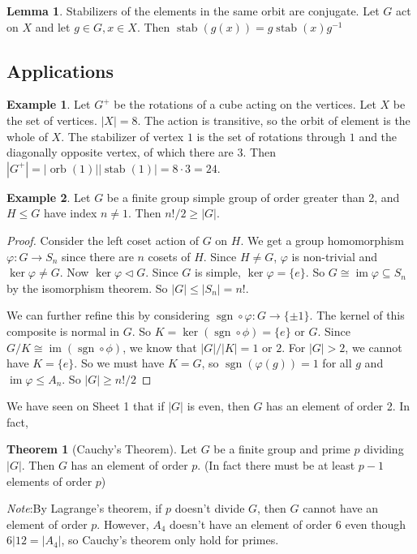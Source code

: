 \documentclass[a4paper]{article}
\theoremstyle{definition}
\newtheorem*{thm}{Theorem}
\newtheorem*{eg}{Example}
\newtheorem*{lemma}{Lemma}
\newcommand{\note}{\noindent \emph{Note}:\;}
\DeclareMathOperator\im{im}
\DeclareMathOperator\sgn{sgn}
\DeclareMathOperator\orb{orb}
\DeclareMathOperator\stab{stab}
\begin{document}
\begin{lemma}
  Stabilizers of the elements in the same orbit are conjugate. Let $G$ act on $X$ and let $g\in G, x\in X$. Then $\stab(g(x)) = g\stab(x)g^{-1}$
\end{lemma}

\subsection{Applications}
\begin{eg}
  Let $G^{+}$ be the rotations of a cube acting on the vertices. Let $X$ be the set of vertices. $|X| = 8$. The action is transitive, so the orbit of element is the whole of $X$. The stabilizer of vertex $1$ is the set of rotations through $1$ and the diagonally opposite vertex, of which there are 3. Then $|G^{+}| = |\orb(1)||\stab(1)| = 8\cdot 3 = 24$.
\end{eg}

\begin{eg}
  Let $G$ be a finite group simple group of order greater than 2, and $H\leq G$ have index $n\not= 1$. Then $n!/2 \geq |G|$.
\end{eg}

\begin{proof}
Consider the left coset action of $G$ on $H$. We get a group homomorphism $\varphi: G\to S_n$ since there are $n$ cosets of $H$. Since $H\not= G$, $\varphi$ is non-trivial and $\ker \varphi \not=G$. Now $\ker \varphi \lhd G$. Since $G$ is simple, $\ker\varphi = \{e\}$. So $G\cong \im \varphi \subseteq S_n$ by the isomorphism theorem. So $|G| \leq |S_n| = n!$.

We can further refine this by considering $\sgn\circ \varphi: G \to \{\pm 1\}$. The kernel of this composite is normal in $G$. So $K = \ker(\sgn\circ\phi) = \{e\}$ or $G$. Since $G/K\cong \im (\sgn\circ\phi)$, we know that $|G|/|K| = 1$ or $2$. For $|G|> 2$, we cannot have $K = \{e\}$. So we must have $K = G$, so $\sgn(\varphi(g)) = 1$ for all $g$ and $\im \varphi \leq A_n$. So $|G|\geq n!/2$
\end{proof}

We have seen on Sheet 1 that if $|G|$ is even, then $G$ has an element of order 2. In fact,
\begin{thm}[Cauchy's Theorem]
  Let $G$ be a finite group and prime $p$ dividing $|G|$. Then $G$ has an element of order $p$. (In fact there must be at least $p - 1$ elements of order $p$)

  \note By Lagrange's theorem, if $p$ doesn't divide $G$, then $G$ cannot have an element of order $p$. However, $A_4$ doesn't have an element of order $6$ even though $6 | 12 = |A_4|$, so Cauchy's theorem only hold for primes.
\end{thm}
\end{document}
